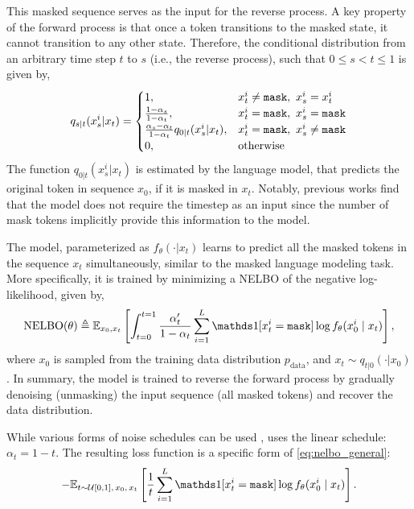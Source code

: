 This masked sequence serves as the input for the reverse process. A key property of the forward process is that once a token transitions to the masked state, it cannot transition to any other state. Therefore, the conditional distribution from an arbitrary time step $t$ to $s$ (i.e., the reverse process), such that $0 \leq s < t \leq 1$ is given by,
\begin{equation}
    q_{s|t}(x^i_s|x_t) = \begin{cases}
                    1, & x_t^i \neq {\texttt{mask}},\ x_s^i = x_t^i \\
                    \frac{1 - \alpha_s}{1 - \alpha_t}, & x_t^i = {\texttt{mask}},\ x_s^i = {\texttt{mask}} \\
                    \frac{\alpha_s - \alpha_t}{1 - \alpha_t}q_{0|t}(x_s^i|x_t), & x_t^i = {\texttt{mask}},\ x_s^i \neq {\texttt{mask}} \\
                    0, & \text{otherwise} \\
                 \end{cases}
\end{equation}
The function $q_{0|t}(x_s^i|x_t)$ is estimated by the language model, that predicts the original token in sequence $x_0$, if it is masked in $x_t$. Notably, previous works find that the model does not require the timestep as an input \cite{} since the number of mask tokens implicitly provide this information to the model.

The model, parameterized as $f_\theta(\cdot|x_t)$ learns to predict all the masked tokens in the sequence $x_t$ simultaneously, similar to the masked language modeling task. More specifically, it is trained by minimizing a NELBO of the negative log-likelihood, given by,
\begin{equation}
    \label{eq:nelbo_general}
    \text{NELBO}(\theta) \triangleq \mathbb{E}_{x_0, x_t} \left[ \int_{t=0}^{t=1} \frac{\alpha'_t }{1 - \alpha_t} \sum_{i=1}^{L} \indicator[x_t^i = \mask] \log f_{\theta}(x_0^i \mid x_t) \right],
\end{equation}
where $x_0$ is sampled from the training data distribution $p_\text{data}$, and $x_t \sim q_{t|0}(\cdot | x_0)$. In summary, the model is trained to reverse the forward process by gradually denoising (unmasking) the input sequence (all masked tokens) and recover the data distribution.

While various forms of noise schedules can be used \citep{sahoo2024simple,shi2024simplified}, \citet[LLaDA]{nie2025largelanguagediffusionmodels} uses the linear schedule: $\alpha_t = 1 - t$. The resulting loss function is a specific form of \cref{eq:nelbo_general}:
\begin{equation}
    -\mathbb{E}_{t \sim \mathcal{U}[0,1], \, x_0, \, x_t} \left[  \frac{1}{t} \sum_{i=1}^{L} \indicator[x_t^i = \mask] \log f_{\theta}(x_0^i \mid x_t) \right].
\end{equation}






